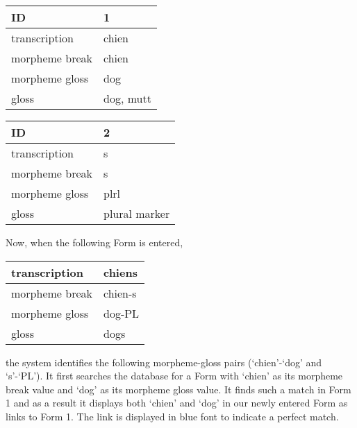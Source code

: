\documentclass[letterpaper,10pt,english]{sphinxmanual}
\begin{document}
\begin{tabulary}{\linewidth}{|L|L|}
\hline

ID
 & 
1
\\\hline

transcription
 & 
chien
\\\hline

morpheme break
 & 
chien
\\\hline

morpheme gloss
 & 
dog
\\\hline

gloss
 & 
dog, mutt
\\\hline
\end{tabulary}


\begin{tabulary}{\linewidth}{|L|L|}
\hline

ID
 & 
2
\\\hline

transcription
 & 
s
\\\hline

morpheme break
 & 
s
\\\hline

morpheme gloss
 & 
plrl
\\\hline

gloss
 & 
plural marker
\\\hline
\end{tabulary}


Now, when the following Form is entered,

\begin{tabulary}{\linewidth}{|L|L|}
\hline

transcription
 & 
chiens
\\\hline

morpheme break
 & 
chien-s
\\\hline

morpheme gloss
 & 
dog-PL
\\\hline

gloss
 & 
dogs
\\\hline
\end{tabulary}


the system identifies the following morpheme-gloss pairs (`chien'-`dog' and
`s'-`PL').  It first searches the database for a Form with `chien' as its
morpheme break value and `dog' as its morpheme gloss value.  It finds such a
match in Form 1 and as a result it displays both `chien' and `dog' in our newly
entered Form as links to Form 1.  The link is displayed in blue font to indicate
a perfect match.
\end{document}
